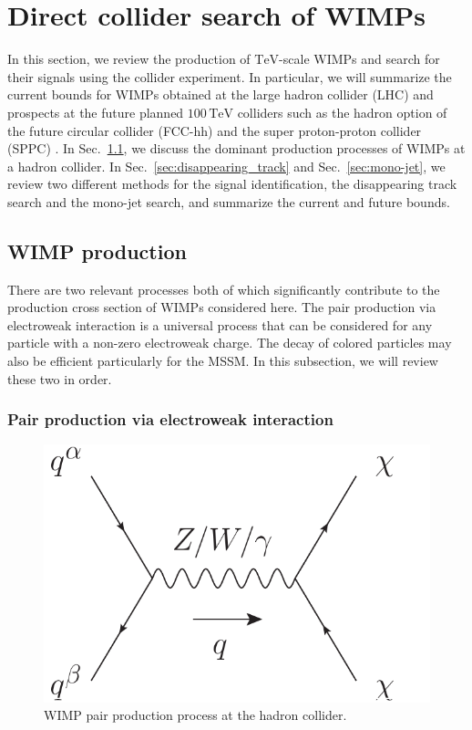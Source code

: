 \documentclass[12pt,twoside,book]{article}
\begin{document}
\section{Direct collider search of WIMPs}
\setcounter{equation}{0}
\label{sec:direct}

\vskip 0.1in

In this section, we review the production of $\mathrm{TeV}$-scale WIMPs and search for their signals using the collider experiment.
In particular, we will summarize the current bounds for WIMPs obtained at the large hadron collider (LHC) and prospects at the future planned $100\,\mathrm{TeV}$ colliders such as the hadron option of the future circular collider (FCC-hh) \cite{Benedikt:2651300} and the super proton-proton collider (SPPC) \cite{CEPC-SPPCStudyGroup:2015csa, CEPC-SPPCStudyGroup:2015esa}.
In Sec.~\ref{sec:wimp_production}, we discuss the dominant production processes of WIMPs at a hadron collider.
In Sec.~\ref{sec:disappearing_track} and Sec.~\ref{sec:mono-jet}, we review two different methods for the signal identification, the disappearing track search and the mono-jet search, and summarize the current and future bounds.


\subsection{WIMP production}
\label{sec:wimp_production}

There are two relevant processes both of which significantly contribute to the production cross section of WIMPs considered here.
The pair production via electroweak interaction is a universal process that can be considered for any particle with a non-zero electroweak charge.
The decay of colored particles may also be efficient particularly for the MSSM.
In this subsection, we will review these two in order.


\subsubsection*{Pair production via electroweak interaction}

\begin{figure}[b]
  \centering
  \includegraphics[width=0.4\hsize]{WIMP_production.pdf}
  \caption{WIMP pair production process at the hadron collider.}
  \label{fig:wimp_production}
\end{figure}
\end{document}
